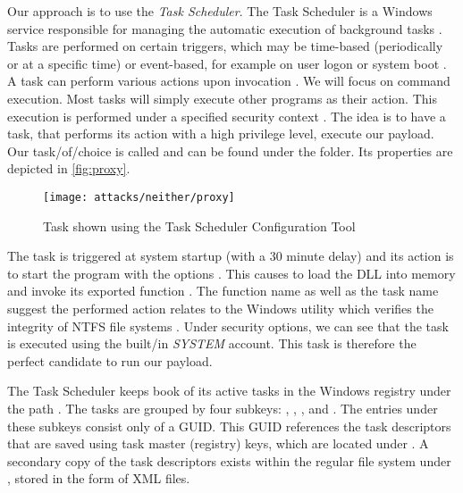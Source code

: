 Our approach is to use the \emph{Task Scheduler}.
The Task Scheduler is a Windows service responsible for managing the automatic execution of background tasks \cite[Section 10]{windows-internals-7-part2}.
Tasks are performed on certain triggers, which may be time-based (periodically or at a specific time) or event-based, for example on user logon or system boot \cite{microsoft-task-scheduler-triggers}.
A task can perform various actions upon invocation \cite{microsoft-task-scheduler-actions}.
We will focus on command execution.
Most tasks will simply execute other programs as their action.
This execution is performed under a specified security context \cite{microsoft-task-scheduler-security-contexts}.
The idea is to have a task, that performs its action with a high privilege level, execute our payload.
Our task\-/of\-/choice is called  and can be found under the  folder.
Its properties are depicted in \autoref{fig:proxy}.

\begin{figure}[htb]
    \centering
    \texttt{[image: attacks/neither/proxy]}
    \caption{ Task shown using the Task Scheduler Configuration Tool}
    \label{fig:proxy}
\end{figure}

The  task is triggered at system startup (with a 30 minute delay) and its action is to start the program  with the options .
This causes  to load the  \ac{DLL} into memory and invoke its exported function  \cite{microsoft-rundll32}.
The function name as well as the task name suggest the performed action relates to the Windows utility  which verifies the integrity of \ac{NTFS} file systems \cite{microsoft-autochk}.
Under security options, we can see that the task is executed using the built\-/in \emph{SYSTEM} account.
This task is therefore the perfect candidate to run our payload.

The Task Scheduler keeps book of its active tasks in the Windows registry under the path .
The tasks are grouped by four subkeys: , , , and .
The entries under these subkeys consist only of a \ac{GUID}.
This \ac{GUID} references the task descriptors that are saved using task master (registry) keys, which are located under  \cite[Section 10]{windows-internals-7-part2}.
A secondary copy of the task descriptors exists within the regular file system under , stored in the form of \ac{XML} files.

